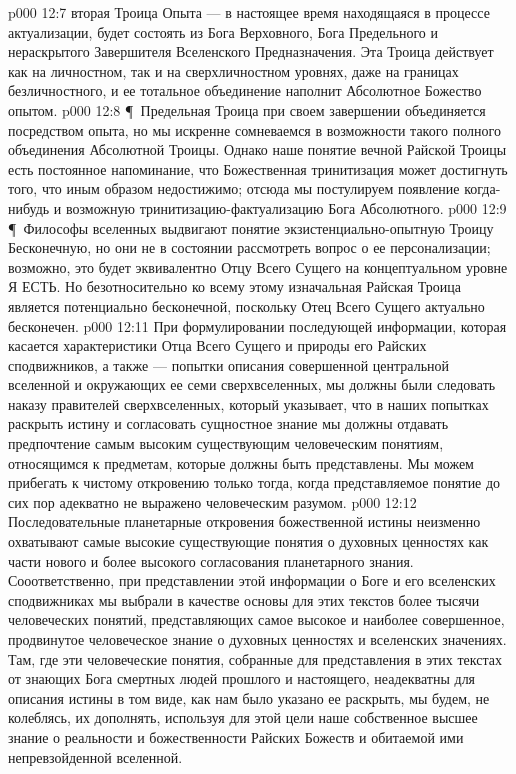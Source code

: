 \vs p000 12:7 \bibnobreakspace {} вторая Троица Опыта --- в настоящее время находящаяся в процессе актуализации, будет состоять из Бога Верховного, Бога Предельного и нераскрытого Завершителя Вселенского Предназначения. Эта Троица действует как на личностном, так и на сверхличностном уровнях, даже на границах безличностного, и ее тотальное объединение наполнит Абсолютное Божество опытом.
\vs p000 12:8 \P\ Предельная Троица при своем завершении объединяется посредством опыта, но мы искренне сомневаемся в возможности такого полного объединения Абсолютной Троицы. Однако наше понятие вечной Райской Троицы есть постоянное напоминание, что Божественная тринитизация может достигнуть того, что иным образом недостижимо; отсюда мы постулируем появление когда\hyp{}нибудь  и возможную тринитизацию\hyp{}фактуализацию Бога Абсолютного.
\vs p000 12:9 \P\ Философы вселенных выдвигают понятие  экзистенциально\hyp{}опытную Троицу Бесконечную, но они не в состоянии рассмотреть вопрос о ее персонализации; возможно, это будет эквивалентно Отцу Всего Сущего на концептуальном уровне Я ЕСТЬ. Но безотносительно ко всему этому изначальная Райская Троица является потенциально бесконечной, поскольку Отец Всего Сущего актуально бесконечен.
\vs p000 12:11 При формулировании последующей информации, которая касается характеристики Отца Всего Сущего и природы его Райских сподвижников, а также --- попытки описания совершенной центральной вселенной и окружающих ее семи сверхвселенных, мы должны были следовать наказу правителей сверхвселенных, который указывает, что в наших попытках раскрыть истину и согласовать сущностное знание мы должны отдавать предпочтение самым высоким существующим человеческим понятиям, относящимся к предметам, которые должны быть представлены. Мы можем прибегать к чистому откровению только тогда, когда представляемое понятие до сих пор адекватно не выражено человеческим разумом.
\vs p000 12:12 Последовательные планетарные откровения божественной истины неизменно охватывают самые высокие существующие понятия о духовных ценностях как части нового и более высокого согласования планетарного знания. Сооответственно, при представлении этой информации о Боге и его вселенских сподвижниках мы выбрали в качестве основы для этих текстов более тысячи человеческих понятий, представляющих самое высокое и наиболее совершенное, продвинутое человеческое знание о духовных ценностях и вселенских значениях. Там, где эти человеческие понятия, собранные для представления в этих текстах от знающих Бога смертных людей прошлого и настоящего, неадекватны для описания истины в том виде, как нам было указано ее раскрыть, мы будем, не колеблясь, их дополнять, используя для этой цели наше собственное высшее знание о реальности и божественности Райских Божеств и обитаемой ими непревзойденной вселенной.
